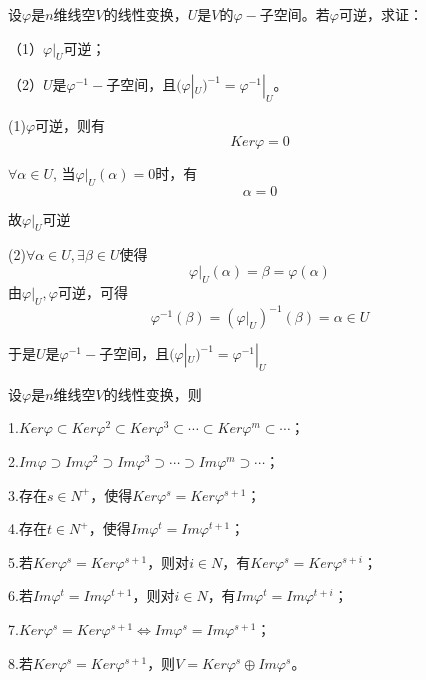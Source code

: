 \documentclass[lang=cn,10pt]{elegantbook}
\begin{document}
\begin{example}
	设$\varphi$是$n$维线空$V$的线性变换，$U$是$V$的$\varphi-$子空间。若$\varphi$可逆，求证：
	
	（1）$\varphi|_U$可逆；
	
	（2）$U$是$\varphi^{-1}-$子空间，且$(\varphi|_U)^{-1}=\varphi^{-1}|_U$。
\end{example}
\begin{solution}
	
	(1)$\varphi$可逆，则有
	\begin{equation*}
		Ker\varphi=0
	\end{equation*}
	
	$\forall\alpha\in U$,
	当$ \varphi|_{U}(\alpha)=0$时，有
	\begin{equation*}
		\alpha=0
	\end{equation*}
	
	故$\varphi|_U$可逆
	
	(2)$\forall \alpha \in U, \exists \beta \in U$使得
	\begin{equation*}
		\varphi|_U(\alpha)=\beta=\varphi(\alpha)
	\end{equation*}
	由$\varphi|_U,\varphi$可逆，可得
	\begin{equation*}
		\varphi^{-1}(\beta)=(\varphi|_U)^{-1}(\beta)=\alpha\in U
	\end{equation*}
	
	于是$U$是$\varphi^{-1}-$子空间，且$(\varphi|_U)^{-1}=\varphi^{-1}|_U$
\end{solution}
\begin{example}
	设$\varphi$是$n$维线空$V$的线性变换，则
	
	1.$Ker\varphi\subset Ker\varphi^2\subset Ker\varphi^3\subset\cdots\subset Ker\varphi^m\subset\cdots$；
	
	
	2.$Im{\varphi}\supset I m{\varphi^2}\supset I m{\varphi^3}\supset\cdots\supset I m{\varphi^m}\supset\cdots$；
	
	3.存在$s\in N^+$，使得$Ker\varphi^s=Ker\varphi^{s+1}$；
	
	4.存在$t\in N^+$，使得$Im{\varphi^t}=Im{\varphi^{t+1}}$；
	
	5.若$Ker\varphi^s=Ker\varphi^{s+1}$，则对$i\in N$，有$Ker\varphi^s=Ker\varphi^{s+i}$；
	
	6.若$Im{\varphi^t}=Im{\varphi^{t+1}}$，则对$i\in N$，有$Im{\varphi^t}=Im{\varphi^{t+i}}$；
	
	7.$Ker\varphi^s=Ker\varphi^{s+1}\Leftrightarrow I m{\varphi^s}=Im{\varphi^{s+1}}$；
	
	8.若$Ker\varphi^s=Ker\varphi^{s+1}$，则$V=Ker\varphi^s\oplus I m{\varphi^s}$。
	
\end{example}
\end{document}
